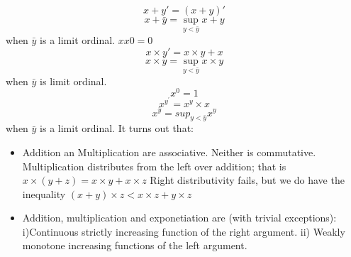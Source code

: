 \documentclass[a4paper,10pt]{article}
\begin{document}
\begin{enumerate}
\begin{equation}
 x + y' = (x + y)'
\end{equation}
\begin{equation}
 x + \bar{y} = \sup_{y \lt \bar{y}}x+y
\end{equation}
when $\bar{y}$ is a limit ordinal.
$x x 0 = 0$
\begin{equation}
 x \times y' = x \times y + x
\end{equation}
\begin{equation}
 x \times \bar{y} = \sup_{y \lt \bar{y}}x \times y
\end{equation}
when $\bar{y}$ is limit ordinal. 
\begin{equation}
 x^{0} = 1
\end{equation}
\begin{equation}
 x^{y}^{'} = x^{y} \times x
\end{equation}
\begin{equation}
 x^{\bar{y}} = sup_{y \lt \bar{y}} x^{y}
\end{equation}
when $\bar{y}$ is a limit ordinal. 
It turns out that:
\begin{itemize}
 \item Addition an Multiplication are associative. Neither is commutative. Multiplication
distributes from the left over addition; that is
$x \times (y + z) = x \times y + x \times z$
Right distributivity fails, but we do have the inequality 
$(x + y)\times z \lt x \times z + y \times z$
\item Addition, multiplication and exponetiation are (with trivial exceptions): 
i)Continuous strictly increasing function of the right argument.
ii) Weakly monotone increasing functions of the left argument.
\end{itemize}
\end{enumerate}
\end{document}
